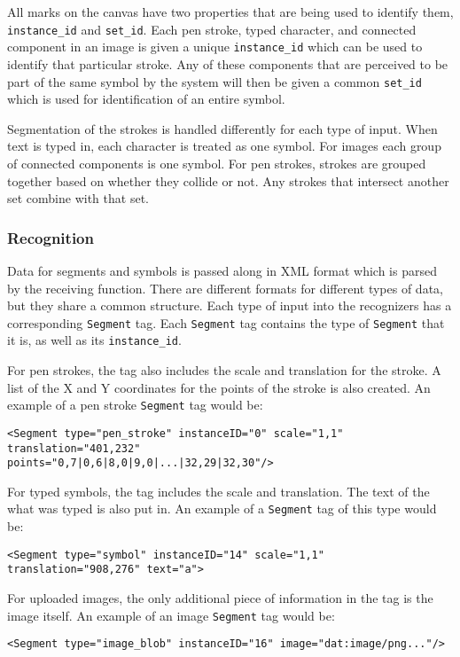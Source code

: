 \documentclass[letterpaper]{article}
\begin{document}
All marks on the canvas have two properties that are being used to identify them,
\verb+instance_id+ and \verb+set_id+. Each pen stroke, typed character, and connected
component in an image is given a unique \verb+instance_id+ which can be used to identify
that particular stroke. Any of these components that are perceived to be part of the same
symbol by the system will then be given a common \verb+set_id+ which is used for identification
of an entire symbol.

Segmentation of the strokes is handled differently for each type of input. When text is typed
in, each character is treated as one symbol. For images each group of connected components is
one symbol. For pen strokes, strokes are grouped together based on whether they collide or not.
Any strokes that intersect another set combine with that set.

\subsubsection*{Recognition}
Data for segments and symbols is passed along in XML format which is parsed by the
receiving function. There are different formats for different types of data, but they share a
common structure. Each type of input into the recognizers has a corresponding \verb+Segment+
tag. Each \verb+Segment+ tag contains the type of \verb+Segment+ that it is, as well as its
\verb+instance_id+.

For pen strokes, the tag also includes the scale and translation for the stroke. A list of the
X and Y coordinates for the points of the stroke is also created. An example of a pen stroke
\verb+Segment+ tag would be:
\begin{verbatim}<Segment type="pen_stroke" instanceID="0" scale="1,1" translation="401,232"
points="0,7|0,6|8,0|9,0|...|32,29|32,30"/>\end{verbatim}

For typed symbols, the tag includes the scale and translation. The text of the what was typed
is also put in. An example of a \verb+Segment+ tag of this type would be:
\begin{verbatim}<Segment type="symbol" instanceID="14" scale="1,1" translation="908,276" text="a">\end{verbatim}

For uploaded images, the only additional piece of information in the tag is the image itself.
An example of an image \verb+Segment+ tag would be:
\begin{verbatim}<Segment type="image_blob" instanceID="16" image="dat:image/png..."/>\end{verbatim}
\end{document}
